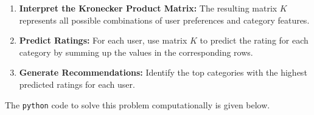 \documentclass[
  letterpaper,
  DIV=11,
  numbers=noendperiod]{scrreprt}
\theoremstyle{plain}
\theoremstyle{definition}
\theoremstyle{remark}
\begin{document}
\begin{enumerate}
\def\labelenumi{\arabic{enumi}.}
\setcounter{enumi}{1}
\item
  \textbf{Interpret the Kronecker Product Matrix:} The resulting matrix
  \(K\) represents all possible combinations of user preferences and
  category features.
\item
  \textbf{Predict Ratings:} For each user, use matrix \(K\) to predict
  the rating for each category by summing up the values in the
  corresponding rows.
\item
  \textbf{Generate Recommendations:} Identify the top categories with
  the highest predicted ratings for each user.
\end{enumerate}

The \texttt{python} code to solve this problem computationally is given
below.
\end{document}
